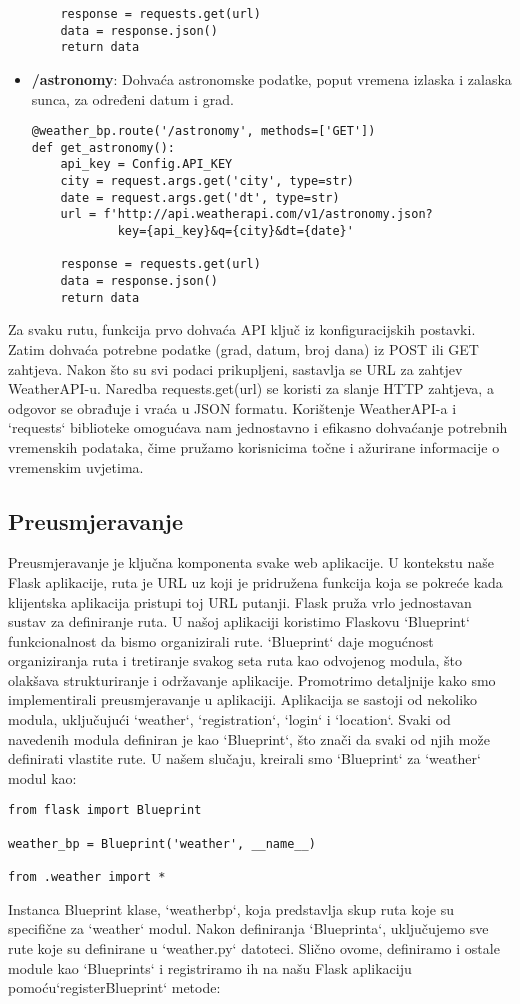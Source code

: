 \documentclass[times, utf8, zavrsni]{fer}
\begin{document}
\begin{itemize}
\begin{verbatim}
    response = requests.get(url)
    data = response.json()
    return data
\end{verbatim}
\item \textbf{/astronomy}: Dohvaća astronomske podatke, poput vremena izlaska i zalaska sunca, za određeni datum i grad.
\begin{verbatim}
@weather_bp.route('/astronomy', methods=['GET'])
def get_astronomy():
    api_key = Config.API_KEY
    city = request.args.get('city', type=str)
    date = request.args.get('dt', type=str)
    url = f'http://api.weatherapi.com/v1/astronomy.json?
            key={api_key}&q={city}&dt={date}'

    response = requests.get(url)
    data = response.json()
    return data
\end{verbatim}
\end{itemize}
Za svaku rutu, funkcija prvo dohvaća API ključ iz konfiguracijskih postavki. Zatim dohvaća potrebne podatke (grad, datum, broj dana) iz POST ili GET zahtjeva. Nakon što su svi podaci prikupljeni, sastavlja se URL za zahtjev WeatherAPI-u. Naredba requests.get(url) se koristi za slanje HTTP zahtjeva, a odgovor se obrađuje i vraća u JSON formatu. Korištenje WeatherAPI-a i `requests` biblioteke omogućava nam jednostavno i efikasno dohvaćanje potrebnih vremenskih podataka, čime pružamo korisnicima točne i ažurirane informacije o vremenskim uvjetima.

\subsection{Preusmjeravanje}

Preusmjeravanje je ključna komponenta svake web aplikacije. U kontekstu naše Flask aplikacije, ruta je URL uz koji je pridružena funkcija koja se pokreće kada klijentska aplikacija pristupi toj URL putanji. Flask pruža vrlo jednostavan sustav za definiranje ruta. U našoj aplikaciji koristimo Flaskovu `Blueprint` funkcionalnost da bismo organizirali rute. `Blueprint` daje mogućnost organiziranja ruta i tretiranje svakog seta ruta kao odvojenog modula, što olakšava strukturiranje i održavanje aplikacije. Promotrimo detaljnije kako smo implementirali preusmjeravanje u aplikaciji. Aplikacija se sastoji od nekoliko modula, uključujući `weather`, `registration`, `login` i `location`. Svaki od navedenih modula definiran je kao `Blueprint`, što znači da svaki od njih može definirati vlastite rute. U našem slučaju, kreirali smo `Blueprint` za `weather` modul kao:
\begin{verbatim}
from flask import Blueprint

weather_bp = Blueprint('weather', __name__)

from .weather import *
\end{verbatim}
Instanca Blueprint klase, `weatherbp`, koja predstavlja skup ruta koje su specifične za `weather` modul. Nakon definiranja `Blueprinta`, uključujemo sve rute koje su definirane u `weather.py` datoteci. Slično ovome, definiramo i ostale module kao `Blueprints` i registriramo ih na našu Flask aplikaciju pomoću`registerBlueprint` metode:
\end{document}
